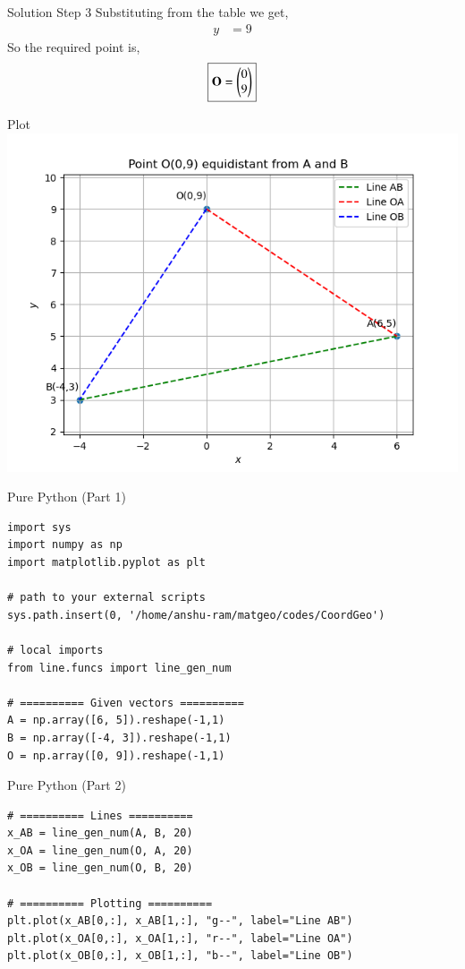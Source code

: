 \documentclass{beamer}
\begin{document}
\begin{frame}{Solution Step 3}
Substituting from the table we get,  
\begin{align}
y &= 9
\end{align}
So the required point is,  
\[
\boxed{\mathbf{O} = \begin{pmatrix}0 \\ 9\end{pmatrix}}
\]
\end{frame}
\begin{frame}{Plot}
\centering
\includegraphics[width=\columnwidth, height=0.8\textheight, keepaspectratio]{figs/equidistant_point.png}
\end{frame}



\begin{frame}[fragile]{Pure Python (Part 1)}
\begin{lstlisting}
import sys
import numpy as np
import matplotlib.pyplot as plt

# path to your external scripts
sys.path.insert(0, '/home/anshu-ram/matgeo/codes/CoordGeo')

# local imports
from line.funcs import line_gen_num

# ========== Given vectors ==========
A = np.array([6, 5]).reshape(-1,1)
B = np.array([-4, 3]).reshape(-1,1)
O = np.array([0, 9]).reshape(-1,1)
\end{lstlisting}
\end{frame}

\begin{frame}[fragile]{Pure Python (Part 2)}
\begin{lstlisting}
# ========== Lines ==========
x_AB = line_gen_num(A, B, 20)
x_OA = line_gen_num(O, A, 20)
x_OB = line_gen_num(O, B, 20)

# ========== Plotting ==========
plt.plot(x_AB[0,:], x_AB[1,:], "g--", label="Line AB")
plt.plot(x_OA[0,:], x_OA[1,:], "r--", label="Line OA")
plt.plot(x_OB[0,:], x_OB[1,:], "b--", label="Line OB")
\end{lstlisting}
\end{frame}
\end{document}
